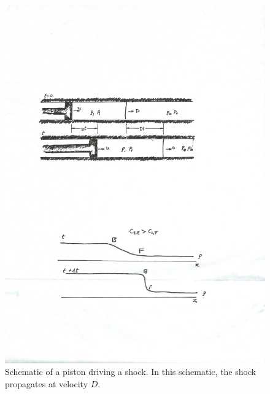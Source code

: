 \begin{figure}[htbp]
\includegraphics[width=\textwidth]{piston}
\caption{Schematic of a piston driving a shock.  In this schematic, the shock propagates at velocity $D$.}
\label{f.piston}
\end{figure}

